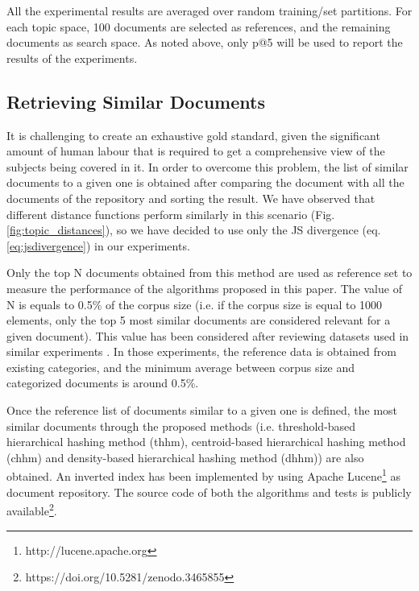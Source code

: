 All the experimental results are averaged over random training/set partitions. For each topic space, 100 documents are selected as references, and the remaining documents as search space. As noted above, only p@5 will be used to report the results of the experiments.

\subsection{Retrieving Similar Documents}
\label{sec:comparison-search}

It is challenging to create an exhaustive gold standard, given the significant amount of human labour that is required to get a comprehensive view of the subjects being covered in it. In order to overcome this problem, the list of similar documents to a given one is obtained after comparing the document with all the documents of the repository and sorting the result. We have observed that different distance functions perform similarly in this scenario (Fig. \ref{fig:topic_distances}), so we have decided to use only the JS divergence (eq. \ref{eq:jsdivergence}) in our experiments.

Only the top N documents obtained from this method are used as reference set to measure the performance of the algorithms proposed in this paper. The value of N is equals to 0.5\% of the corpus size (i.e. if the corpus size is equal to 1000 elements, only the top 5 most similar documents are considered relevant for a given document). This value has been considered after reviewing datasets used in similar experiments \citep{Krstovski2013a, Mao2017}. In those experiments, the reference data is obtained from existing categories, and the minimum average between corpus size and categorized documents is around 0.5\%. 

Once the reference list of documents similar to a given one is defined, the most similar documents through the proposed methods (i.e. threshold-based hierarchical hashing method (thhm), centroid-based hierarchical hashing method (chhm) and density-based hierarchical hashing method (dhhm)) are also obtained. An inverted index has been implemented by using Apache Lucene\footnote{http://lucene.apache.org} as document repository. The source code of both the algorithms and tests is publicly available\footnote{https://doi.org/10.5281/zenodo.3465855}. 

